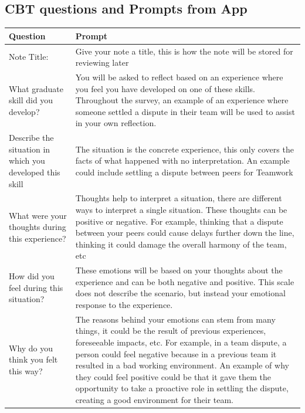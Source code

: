 \documentclass{l4proj}
\begin{document}
\begin{appendices}
%

\section{CBT questions and Prompts from App} \label{Appendix-AppCBTQuestions-Prompts}

\begin{center}
    \begin{longtable}{ | m{8em} | m{10cm}| } 
    \hline
    \textbf{Question} & \textbf{Prompt} \\ [0.5ex] 
    \hline\hline
    Note Title: & Give your note a title, this is how the note will be stored for reviewing later \\ 
    \hline
    What graduate skill did you develop? & You will be asked to reflect based on an experience where you feel you have developed on one of these skills. Throughout the survey, an example of an experience where someone settled a dispute in their team will be used to assist in your own reflection. \\
    \hline
    Describe the situation in which you developed this skill & The situation is the concrete experience, this only covers the facts of what happened with no interpretation. An example could include settling a dispute between peers for Teamwork \\
    \hline
    What were your thoughts during this experience? & Thoughts help to interpret a situation, there are different ways to interpret a single situation. These thoughts can be positive or negative. For example, thinking that a dispute between your peers could cause delays further down the line, thinking it could damage the overall harmony of the team, etc \\
    \hline
    How did you feel during this situation? & These emotions will be based on your thoughts about the experience and can be both negative and positive. This scale does not describe the scenario, but instead your emotional response to the experience. \\
    \hline
    Why do you think you felt this way? & The reasons behind your emotions can stem from many things, it could be the result of previous experiences, foreseeable impacts, etc. For example, in a team dispute, a person could feel negative because in a previous team it resulted in a bad working environment. An example of why they could feel positive could be that it gave them the opportunity to take a proactive role in settling the dispute, creating a good environment for their team. \\

\end{longtable}
\end{center}
\end{appendices}
\end{document}
